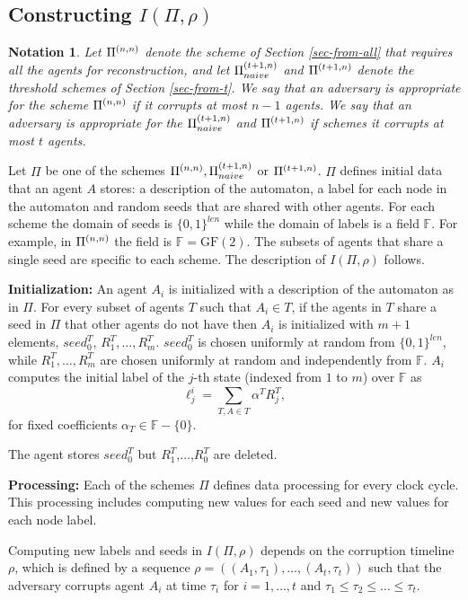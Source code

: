 \documentclass[letterpaper,11pt]{article}
\newcommand{\nnPi}{{\rm {\Pi}}^{(n,n)}}
\newcommand{\tnPiNaive}{{\rm {\Pi}}^{(t+1,n)}_{naive}}
\newcommand{\tnPi}{{\rm {\Pi}}^{(t+1,n)}}
\newtheorem{notation}{Notation}
\begin{document}
\subsection{Constructing $I(\Pi, \rho)$}

\begin{notation}
Let $\nnPi$ denote the scheme of Section \ref{sec-from-all} that
requires all the agents for reconstruction, and let $\tnPiNaive$ 
and $\tnPi$
denote the threshold schemes of Section \ref{sec-from-t}. We say that
an adversary is {\em appropriate} for the scheme $\nnPi$ if it
corrupts at most $n-1$ agents. We say that an adversary is {\em
appropriate} for the $\tnPiNaive$ and $\tnPi$ if schemes it corrupts
at most $t$ agents.
\end{notation}


Let $\Pi$ be one of the schemes $\nnPi, \tnPiNaive$ or $\tnPi$. $\Pi$ defines initial data that an agent $A$ stores: a description of the automaton, a label for each node in the automaton and random seeds that are shared with other agents. For each scheme the domain of seeds is $\{0,1\}^{len}$ while the domain of labels is a field $\mathbb{F}$. For example, in $\nnPi$ the field is $\mathbb{F}=\mbox{GF}(2)$. The subsets of agents that share a single seed are specific to each scheme. The description of $I(\Pi, \rho)$ follows.

\smallskip
\noindent
{\bf Initialization:} An agent $A_i$ is initialized with a description of the automaton as in $\Pi$. For every subset of agents $T$ such that $A_i \in T$, if the agents in $T$ share a seed in $\Pi$ that other agents do not have then $A_i$ is initialized with $m+1$ elements, $seed^T_0$, $R^T_1,\ldots,R^T_m$. $seed^T_0$ is chosen uniformly at random from $\{0,1\}^{len}$, while $R^T_1,\ldots,R^T_m$ are chosen uniformly at random and independently from $\mathbb{F}$. $A_i$ computes the initial label of the $j$-th state (indexed from $1$ to $m$) over $\mathbb{F}$ as 
$$\ell^i_j = \sum_{T, A \in T} \alpha^T R^T_j,$$
for fixed coefficients $\alpha_T \in \mathbb{F}-\{0\}$.

The agent stores $seed^T_0$ but $R^T_1$,$\ldots$,$R^T_0$ are deleted.

\smallskip
\noindent
{\bf Processing:} Each of the schemes $\Pi$ defines data processing for every clock cycle. This processing includes computing new values for each seed and new values for each node label. 

Computing new labels and seeds in $I(\Pi, \rho)$ depends on the corruption timeline $\rho$, which is defined by a sequence $\rho=((A_1, \tau_1),\ldots,(A_t, \tau_t))$ such that the adversary corrupts agent $A_i$ at time $\tau_i$ for $i=1,\ldots,t$ and $\tau_1\leq\tau_2 \leq \ldots \leq \tau_t$. 
\end{document}
